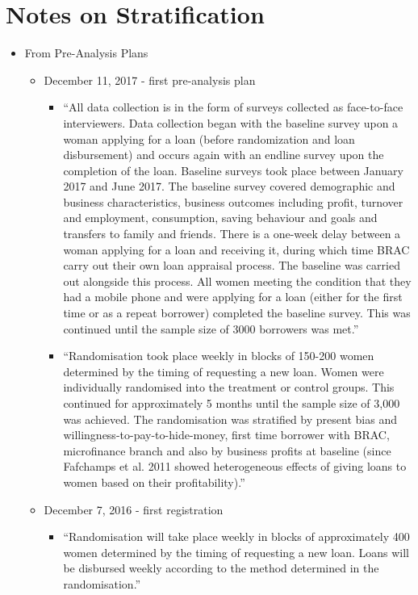 \documentclass[]{article}
\begin{document}
\section{Notes on Stratification}
\begin{itemize}
	\item From Pre-Analysis Plans
	\begin{itemize}
		\item December 11, 2017 - first pre-analysis plan
		\begin{itemize}
			\item ``All data collection is in the form of surveys collected as face-to-face interviewers. Data collection
			began with the baseline survey upon a woman applying for a loan (before randomization and loan
			disbursement) and occurs again with an endline survey upon the completion of the loan. Baseline
			surveys took place between January 2017 and June 2017. The baseline survey covered demographic
			and business characteristics, business outcomes including profit, turnover and employment, consumption, saving behaviour and goals and transfers to family and friends. There is a one-week
			delay between a woman applying for a loan and receiving it, during which time BRAC carry out
			their own loan appraisal process. The baseline was carried out alongside this process. All women
			meeting the condition that they had a mobile phone and were applying for a loan (either for the
			first time or as a repeat borrower) completed the baseline survey. This was continued until the
			sample size of 3000 borrowers was met.''
			\item ``Randomisation took place weekly in blocks of 150-200 women determined by the timing of
			requesting a new loan. Women were individually randomised into the treatment or control groups.
			This continued for approximately 5 months until the sample size of 3,000 was achieved. The randomisation was stratified by present bias and willingness-to-pay-to-hide-money, first time borrower
			with BRAC, microfinance branch and also by business profits at baseline (since Fafchamps et al.
			2011 showed heterogeneous effects of giving loans to women based on their profitability).''
		\end{itemize}
		\item December 7, 2016 - first registration 
		\begin{itemize}
			\item ``Randomisation will take place weekly in blocks of approximately 400 women determined by the timing of requesting a new loan. Loans will be disbursed weekly according to the method determined in the randomisation.''

\end{itemize}
\end{itemize}
\end{itemize}
\end{document}
